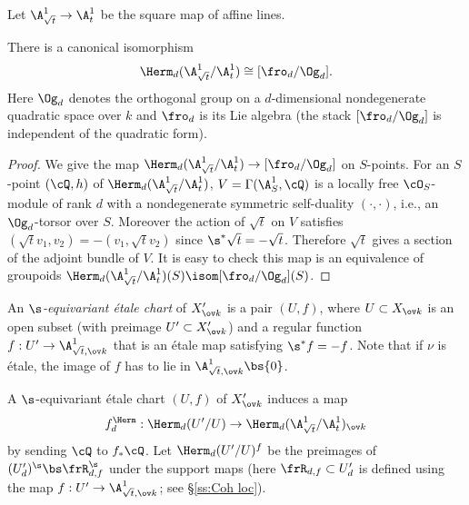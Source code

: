 Let $\A^{1}_{\sqrt{t}}\to \A^{1}_{t}$ be the square map of affine lines.
\begin{lemma}
\notready\label{l:Herm A1} There is a canonical isomorphism
\begin{eqnarray*}
\Herm_{d}(\A^{1}_{\sqrt{t}}/\A^{1}_{t})\cong [\fro_{d}/\Og_{d}].
\end{eqnarray*}
Here $\Og_{d}$ denotes the orthogonal group on a $d$-dimensional nondegenerate quadratic space over $k$ and $\fro_{d}$ is its Lie algebra (the stack $[\fro_{d}/\Og_{d}]$ is independent of the quadratic form).
\end{lemma}
\begin{proof} We give the map $\Herm_{d}(\A^{1}_{\sqrt{t}}/\A^{1}_{t})\to [\fro_{d}/\Og_{d}]$ on $S$-points. For an $S$-point $(\cQ,h)$ of $\Herm_{d}(\A^{1}_{\sqrt{t}}/\A^{1}_{t})$, $V=\Gamma(\A^{1}_{S}, \cQ)$ is a locally free $\cO_{S}$-module of rank $d$ with a nondegenerate symmetric self-duality $(\cdot,\cdot)$, i.e., an $\Og_{d}$-torsor over $S$. Moreover the action of $\sqrt{t}$ on $V$ satisfies $(\sqrt{t}v_{1},v_{2})=-(v_{1},\sqrt{t}v_{2})$ since $\s^{*}\sqrt{t}=-\sqrt{t}$. Therefore $\sqrt{t}$ gives a section of the adjoint bundle of $V$. It is easy to check this map is an equivalence of groupoids $\Herm_{d}(\A^{1}_{\sqrt{t}}/\A^{1}_{t})(S)\isom [\fro_{d}/\Og_{d}](S)$.
\end{proof}



An {\em $\s$-equivariant \'etale chart} of $X'_{\ov k}$ is  a pair $(U,f)$, where $U\subset X_{\ov k}$ is an open subset (with preimage $U'\subset X'_{\ov k}$) and a regular function $f: U'\to \A^{1}_{\sqrt{t}, \ov k}$ that is an \'etale map satisfying $\s^{*}f=-f$. Note that if $\nu$ is \'etale, the image of $f$ has to lie in $\A^{1}_{\sqrt{t}, \ov k}\bs\{0\}$.

A  $\s$-equivariant \'etale chart $(U,f)$ of $X'_{\ov k}$ induces a map
\[
f^{\Herm}_{d}: \Herm_{d}(U'/U)\to \Herm_{d}(\A^{1}_{\sqrt{t}}/\A^{1}_{t})_{\ov k}
\]
by sending $\cQ$ to  $f_{*}\cQ$. Let $\Herm_{d}(U'/U)^{f}$  be the preimages of $(U'_{d})^{\s}\bs \frR^{\s}_{d,f}$ under the support maps (here $\frR_{d,f}\subset U'_{d}$ is defined using the map $f:U'\to \A^{1}_{\sqrt{t},\ov k}$; see \S\ref{ss:Coh loc}).


